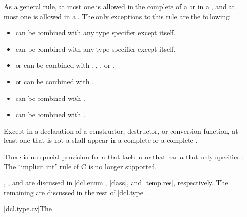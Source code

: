 \pnum
As a general rule, at most one
is allowed in the complete
 of a  or in a
,
and at most one
is allowed in a
.
The only exceptions to this rule are the following:
\begin{itemize}
\item {} can be combined with any type specifier except itself.

\item {} can be combined with any type specifier except itself.

\item {} or  can be combined with
, , , or .

\item {} or  can be combined with .

\item {} can be combined with .

\item {} can be combined with .
\end{itemize}

\pnum
Except in a declaration of a constructor, destructor, or conversion
function, at least one  that is not a
 shall appear in a complete
 or a complete
.
\begin{footnote}
There is no special
provision for a  that
lacks a  or that has a
 that only specifies .
The ``implicit int'' rule of C is no longer supported.
\end{footnote}

\pnum
\begin{note}
,
,
and
are discussed
in
\ref{dcl.enum},
\ref{class},
and
\ref{temp.res}, respectively. The remaining
 are discussed in the rest of \ref{dcl.type}.
\end{note}

[dcl.type.cv]{The }%
%
%
%

